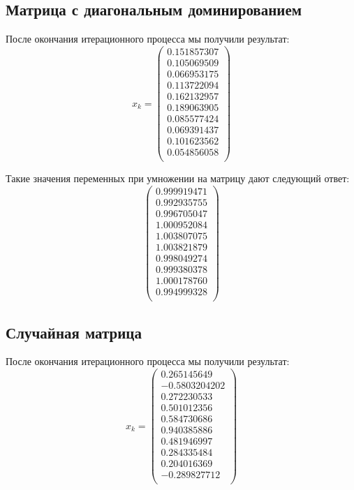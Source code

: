 \documentclass[../../report.tex]{subfiles}
\begin{document}
\subsection{Матрица с диагональным доминированием}
После окончания итерационного процесса мы получили результат:
\[
x_{k} = 
\begin{pmatrix}
    0.151857307 \\
    0.105069509 \\
    0.066953175 \\
    0.113722094 \\
    0.162132957 \\
    0.189063905 \\
    0.085577424 \\
    0.069391437 \\
    0.101623562 \\
    0.054856058 \\
\end{pmatrix}
\]

Такие значения переменных при умножении на матрицу дают следующий ответ:
\[
\begin{pmatrix}
    0.999919471 \\
    0.992935755 \\
    0.996705047 \\
    1.000952084 \\
    1.003807075 \\
    1.003821879 \\
    0.998049274 \\
    0.999380378 \\
    1.000178760 \\
    0.994999328 \\
\end{pmatrix}
\]

\subsection{Случайная матрица}
После окончания итерационного процесса мы получили результат:
\[
x_{k} = 
\begin{pmatrix}
    0.265145649 \\
  -0.5803204202 \\
    0.272230533 \\
    0.501012356 \\
    0.584730686 \\
    0.940385886 \\
    0.481946997 \\
    0.284335484 \\
    0.204016369 \\
   -0.289827712 \\
\end{pmatrix}
\]
\end{document}
